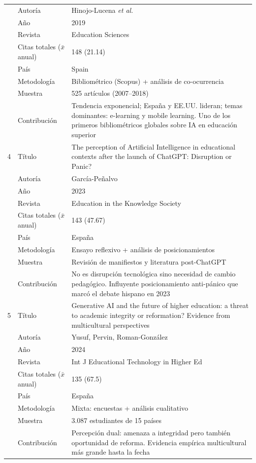 \documentclass[spanish]{textolivre}
\begin{document}
{\begin{longtable}{@{}p{0.2cm}p{3cm}p{10cm}@{}}
  & Autoría & Hinojo-Lucena \textit{et al.}\\
  & Año     & 2019\\
  & Revista &  Education Sciences\\
  & Citas totales ($\bar{x}$ anual) &  148 (21.14) \\
  & País &  Spain\\
  & Metodología & Bibliométrico (Scopus) + análisis de co-ocurrencia \\
  & Muestra & 525 artículos (2007--2018) \\
  & Contribución & Tendencia exponencial; España y EE.UU. lideran; temas dominantes: e-learning y mobile learning. Uno de los primeros bibliométricos globales sobre IA en educación superior \\
\midrule
4 & Título  & The perception of Artificial Intelligence in educational contexts after the launch of ChatGPT: Disruption or Panic? \\
  & Autoría & García-Peñalvo\\
  & Año     & 2023\\
  & Revista & Education in the Knowledge Society\\
  & Citas totales ($\bar{x}$ anual) & 143 (47.67) \\
  & País & España \\
  & Metodología & Ensayo reflexivo + análisis de posicionamientos  \\
  & Muestra & Revisión de manifiestos y literatura post-ChatGPT \\
  & Contribución & No es disrupción tecnológica sino necesidad de cambio pedagógico. Influyente posicionamiento anti-pánico que marcó el debate hispano en 2023\\
\midrule
5 & Título  & Generative AI and the future of higher education: a threat to academic integrity or reformation? Evidence from multicultural perspectives\\
  & Autoría & Yusuf, Pervin, Roman-González \\
  & Año     & 2024\\
  & Revista & Int J Educational Technology in Higher Ed\\
  & Citas totales ($\bar{x}$ anual) & 135 (67.5)\\
  & País &  España\\
  & Metodología & Mixta: encuestas + análisis cualitativo\\
  & Muestra & 3.087 estudiantes de 15 países\\
  & Contribución & Percepción dual: amenaza a integridad pero también oportunidad de reforma. Evidencia empírica multicultural más grande hasta la fecha \\

\end{longtable}}
\end{document}
